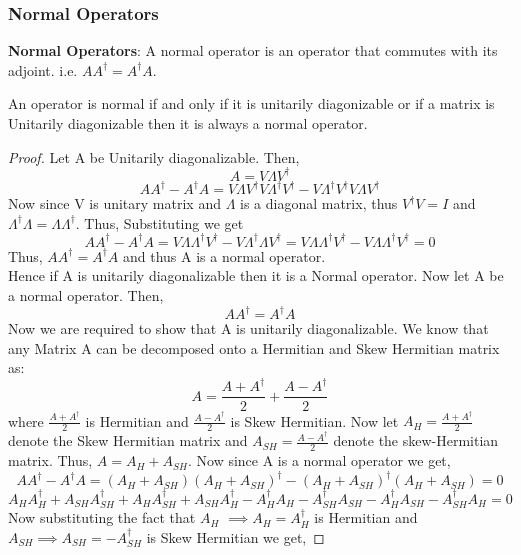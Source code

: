 \subsubsection{Normal Operators}
\begin{definition}
\textbf{Normal Operators}: A normal operator is an operator that commutes with its adjoint. i.e. $AA^{\dagger}=A^{\dagger}A$.\\
\end{definition}
\begin{theorem}
    An operator is normal if and only if it is unitarily diagonizable or if a matrix is Unitarily diagonizable then it is always a normal operator.
\end{theorem}
\begin{proof}
    Let A be Unitarily diagonalizable. Then,
    \[ A=V\Lambda V^{\dagger} \]
    \[ AA^{\dagger} - A^{\dagger}A  = V\Lambda V^{\dagger} V \Lambda^{\dagger} V^{\dagger} - V\Lambda^{\dagger} V^{\dagger} V\Lambda V^{\dagger} \]
    Now since V is unitary matrix and $\Lambda$ is a diagonal matrix, thus $V^{\dagger}V=I$ and $\Lambda^{\dagger}\Lambda=\Lambda \Lambda^{\dagger}$. Thus, Substituting we get
    \[ AA^{\dagger} - A^{\dagger}A = V\Lambda \Lambda^{\dagger} V^{\dagger} - V\Lambda^{\dagger} \Lambda V^{\dagger} = V\Lambda \Lambda^{\dagger} V^{\dagger} - V\Lambda \Lambda^{\dagger} V^{\dagger} = 0 \]
    Thus, $AA^{\dagger}=A^{\dagger}A$ and thus A is a normal operator.\\
    Hence if A is unitarily diagonalizable then it is a Normal operator.
    Now let A be a normal operator. Then,
    \[ AA^{\dagger}=A^{\dagger}A \]
    Now we are required to show that A is unitarily diagonalizable. We know that any Matrix A can be decomposed onto a Hermitian and Skew Hermitian matrix as:
    \[ A=\frac{A+A^{\dagger}}{2} + \frac{A-A^{\dagger}}{2} \]
    where $\frac{A+A^{\dagger}}{2}$ is Hermitian and $\frac{A-A^{\dagger}}{2}$ is Skew Hermitian.
    Now let $A_H=\frac{A+A^{\dagger}}{2}$ denote the Skew Hermitian matrix and $A_{SH}=\frac{A-A^{\dagger}}{2}$ denote the skew-Hermitian matrix.
    Thus, $A=A_H+A_{SH}$. Now since A is a normal operator we get,
    \[ AA^{\dagger}-A^{\dagger}A=(A_H + A_{SH})(A_H + A_{SH})^{\dagger}-(A_H + A_{SH})^{\dagger}(A_H + A_{SH})=0 \]
    \[ A_HA_H^{\dagger}+A_{SH}A_{SH}^{\dagger}+A_HA_{SH}^{\dagger}+A_{SH}A_H^{\dagger}-A_H^{\dagger}A_H-A_{SH}^{\dagger}A_{SH}-A_H^{\dagger}A_{SH}-A_{SH}^{\dagger}A_H=0 \]
    Now substituting the fact that $A_H$ $\implies A_{H}=A_H^{\dagger}$ is Hermitian and $A_{SH} \implies A_{SH}=-A_{SH}^{\dagger}$ is Skew Hermitian we get,

\end{proof}
